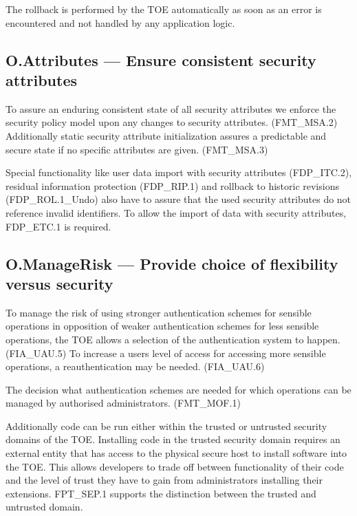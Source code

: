 \documentclass[12pt,english]{scrbook}
\begin{document}
    The rollback is performed by the TOE automatically as soon as an error is
    encountered and not handled by any application logic.

\subsection{O.Attributes --- Ensure consistent security attributes}

    To assure an enduring consistent state of all security attributes we
    enforce the security policy model upon any changes to security attributes.
    (FMT\_MSA.2) Additionally static security attribute initialization assures a predictable and secure state if no specific attributes are given. (FMT\_MSA.3)

    Special functionality like user data import with security attributes
    (FDP\_ITC.2), residual information protection (FDP\_RIP.1) and rollback to
    historic revisions (FDP\_ROL.1\_Undo) also have to assure that the used
    security attributes do not reference invalid identifiers. To allow the
    import of data with security attributes, FDP\_ETC.1 is required.
    
\subsection{O.ManageRisk --- Provide choice of flexibility versus security}

    To manage the risk of using stronger authentication schemes for sensible
    operations in opposition of weaker authentication schemes for less sensible
    operations, the TOE allows a selection of the authentication system to
    happen. (FIA\_UAU.5) To increase a users level of access for accessing more
    sensible operations, a reauthentication may be needed. (FIA\_UAU.6)
    
    The decision what authentication schemes are needed for which operations
    can be managed by authorised administrators. (FMT\_MOF.1)

    Additionally code can be run either within the trusted or untrusted
    security domains of the TOE. Installing code in the trusted security domain
    requires an external entity that has access to the physical secure host to
    install software into the TOE. This allows developers to trade off between
    functionality of their code and the level of trust they have to gain from
    administrators installing their extensions. FPT\_SEP.1 supports the
    distinction between the trusted and untrusted domain.
\end{document}
